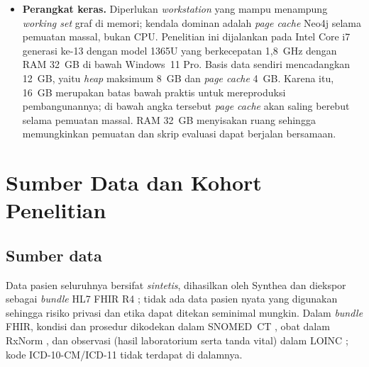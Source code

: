 \begin{itemize}
    dimulai.
    \item \textbf{Perangkat keras.} Diperlukan \emph{workstation} yang mampu menampung
    \emph{working set} graf di memori; kendala dominan adalah \emph{page cache} Neo4j selama
    pemuatan massal, bukan CPU.
    Penelitian ini dijalankan pada Intel Core i7 generasi ke-13 dengan model 1365U yang berkecepatan
    1,8~GHz dengan RAM 32~GB di bawah Windows~11 Pro. Basis data sendiri
    mencadangkan 12~GB, yaitu \emph{heap} maksimum 8~GB dan \emph{page cache} 4~GB. Karena
    itu, 16~GB merupakan batas bawah praktis untuk mereproduksi pembangunannya; di bawah
    angka tersebut \emph{page cache} akan saling berebut selama pemuatan massal. RAM 32~GB menyisakan
    ruang sehingga memungkinkan pemuatan dan skrip evaluasi dapat berjalan bersamaan.
\end{itemize}

\section{Sumber Data dan Kohort Penelitian}
\label{sec:data-source}

\subsection{Sumber data}
Data pasien seluruhnya bersifat \emph{sintetis}, dihasilkan oleh Synthea \cite{synthea} dan
diekspor sebagai \emph{bundle} HL7 FHIR R4 \cite{fhir_r4}; tidak ada data pasien nyata yang
digunakan sehingga risiko privasi dan etika dapat ditekan seminimal mungkin. Dalam
\emph{bundle} FHIR, kondisi dan prosedur dikodekan dalam SNOMED~CT \cite{snomedct}, obat dalam
RxNorm \cite{rxnorm}, dan observasi (hasil laboratorium serta tanda vital) dalam LOINC
\cite{loinc}; kode ICD-10-CM/ICD-11 tidak terdapat di dalamnya.

